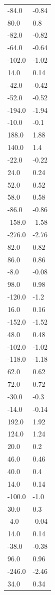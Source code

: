 \begin{longtable}{ll}
-84.0 & -0.84 \\
80.0 & 0.8 \\
-82.0 & -0.82 \\
-64.0 & -0.64 \\
-102.0 & -1.02 \\
14.0 & 0.14 \\
-42.0 & -0.42 \\
-52.0 & -0.52 \\
-194.0 & -1.94 \\
-10.0 & -0.1 \\
188.0 & 1.88 \\
140.0 & 1.4 \\
-22.0 & -0.22 \\
24.0 & 0.24 \\
52.0 & 0.52 \\
58.0 & 0.58 \\
-86.0 & -0.86 \\
-158.0 & -1.58 \\
-276.0 & -2.76 \\
82.0 & 0.82 \\
86.0 & 0.86 \\
-8.0 & -0.08 \\
98.0 & 0.98 \\
-120.0 & -1.2 \\
16.0 & 0.16 \\
-152.0 & -1.52 \\
48.0 & 0.48 \\
-102.0 & -1.02 \\
-118.0 & -1.18 \\
62.0 & 0.62 \\
72.0 & 0.72 \\
-30.0 & -0.3 \\
-14.0 & -0.14 \\
192.0 & 1.92 \\
124.0 & 1.24 \\
20.0 & 0.2 \\
46.0 & 0.46 \\
40.0 & 0.4 \\
14.0 & 0.14 \\
-100.0 & -1.0 \\
30.0 & 0.3 \\
-4.0 & -0.04 \\
14.0 & 0.14 \\
-38.0 & -0.38 \\
96.0 & 0.96 \\
-246.0 & -2.46 \\
34.0 & 0.34 \\

\end{longtable}
